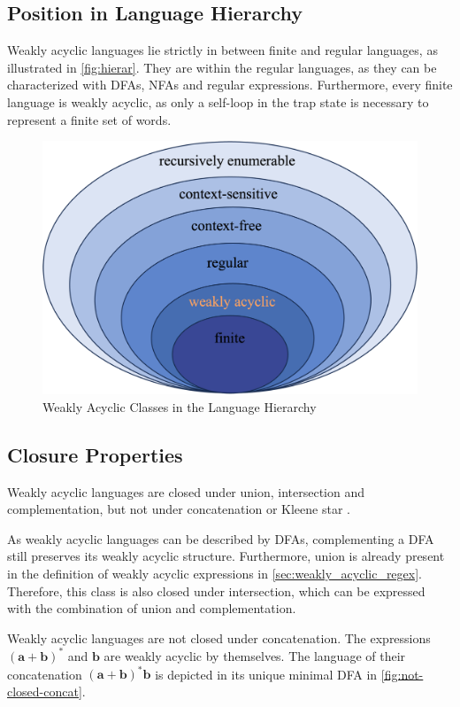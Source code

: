 \subsection{Position in Language Hierarchy}
Weakly acyclic languages lie strictly in between finite and regular languages, as illustrated in \autoref{fig:hierar}.
They are within the regular languages, as they can be characterized with DFAs, NFAs and regular expressions. Furthermore, every finite language is weakly acyclic, as only a self-loop in the trap state is necessary to represent a finite set of words.

\begin{figure}[H]
\centering 
\includegraphics[scale=0.42]{./figures/languages.png}
\caption{Weakly Acyclic Classes in the Language Hierarchy}\label{fig:hierar}
\end{figure}


\subsection{Closure Properties}
Weakly acyclic languages are closed under union, intersection and complementation, but not under concatenation or Kleene star \cite{blondin_24}. 
\par 
As weakly acyclic languages can be described by DFAs, complementing a DFA still preserves its weakly acyclic structure. Furthermore, union is already present in the definition of weakly acyclic expressions in \autoref{sec:weakly_acyclic_regex}. Therefore, this class is also closed under intersection, which can be expressed with the combination of union and complementation. 
\par
Weakly acyclic languages are not closed under concatenation. The expressions $\bm{(a + b)^{*}}$ and $\bm{b}$ are weakly acyclic by themselves. The language of their concatenation $\bm{(a + b)^{*}b}$ is depicted in its unique minimal DFA in \autoref{fig:not-closed-concat}.

